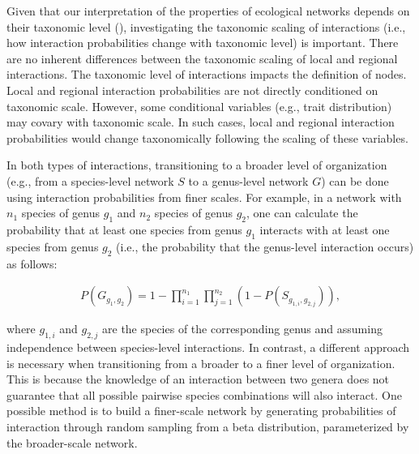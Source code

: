 \begin{box2.4}

Given that our interpretation of the properties of ecological networks depends
on their taxonomic level (\cite{Melian2011Ecoevolutionary}), investigating the
taxonomic scaling of interactions (i.e., how interaction probabilities change with
taxonomic level) is important. There are no inherent differences between the
taxonomic scaling of local and regional interactions. The taxonomic level of
interactions impacts the definition of nodes. Local and regional interaction
probabilities are not directly conditioned on taxonomic scale. However, some
conditional variables (e.g., trait distribution) may covary with taxonomic
scale. In such cases, local and regional interaction probabilities would change
taxonomically following the scaling of these variables.

In both types of interactions, transitioning to a broader level of
organization (e.g., from a species-level network $S$ to a genus-level network
$G$) can be done using interaction probabilities from finer scales. For
example, in a network with $n_1$ species of genus $g_1$ and $n_2$ species of
genus $g_2$, one can calculate the probability that at least one species from
genus $g_1$ interacts with at least one species from genus $g_2$ (i.e., the
probability that the genus-level interaction occurs) as follows:

\begin{eqnarray}
  \label{eq:taxo}
  P(G_{g_1, g_2}) = 1 - \prod_{i = 1}^{n_1}\prod_{j = 1}^{n_2}(1 -
P(S_{g_{1,i}, g_{2,j}})),
\end{eqnarray}

where $g_{1,i}$ and $g_{2,j}$ are the species of the corresponding genus and
assuming independence between species-level interactions. In contrast, a
different approach is necessary when transitioning from a broader to a finer
level of organization. This is because the knowledge of an interaction between
two genera does not guarantee that all possible pairwise species combinations
will also interact. One possible method is to build a finer-scale network by
generating probabilities of interaction through random sampling from a beta
distribution, parameterized by the broader-scale network.


\end{box2.4}
